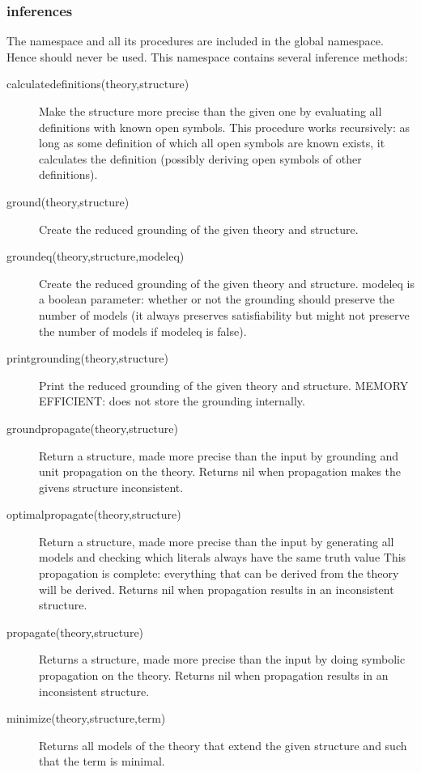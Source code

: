 \subsubsection{inferences}
The  namespace and all its procedures are included in the global namespace. Hence  should never be used. This namespace contains several inference methods:
\begin{description}
	\item[calculatedefinitions(theory,structure)]
		Make the structure more precise than the given one by evaluating all definitions with known open symbols. This procedure works recursively: as long as some definition of which all open symbols are known exists, it calculates the definition (possibly deriving open symbols of other definitions).
		
	\item[ground(theory,structure)]
 		Create the reduced grounding of the given theory and structure. 
 	\item[groundeq(theory,structure,modeleq)]
 		Create the reduced grounding of the given theory and structure. modeleq is a boolean parameter:  whether or not the grounding should preserve the number of models (it always preserves satisfiability but might not preserve the number of models if modeleq is false).
 	\item[printgrounding(theory,structure)]
 		Print the reduced grounding of the given theory and structure.
 		MEMORY EFFICIENT: does not store the grounding internally.
 		
 	\item[groundpropagate(theory,structure)]
 		Return a structure, made more precise than the input by grounding and unit propagation on the theory.
		Returns nil when propagation makes the givens structure inconsistent.
	\item[optimalpropagate(theory,structure)]
 		Return a structure, made more precise than the input by generating all models and checking which literals always have the same truth value
 		This propagation is complete: everything that can be derived from the theory will be derived. 
 		Returns nil when propagation results in an inconsistent structure.
	\item[propagate(theory,structure)]
 		Returns a structure, made more precise than the input by doing symbolic propagation on the theory.
 		Returns nil when propagation results in an inconsistent structure.
 	
	\item[minimize(theory,structure,term)] Returns all models of the theory that extend the given structure and such that the term is minimal.
	

\end{description}
